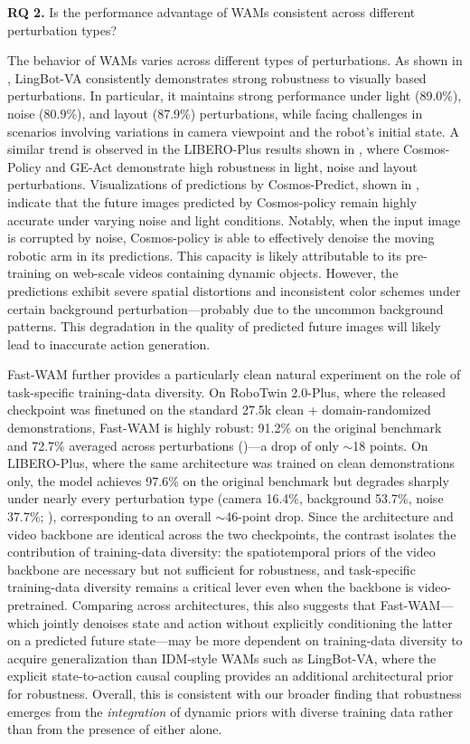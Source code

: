 \documentclass{article}
\begin{document}
\textbf{RQ 2.} Is the performance advantage of WAMs consistent across different perturbation types?

The behavior of WAMs varies across different types of perturbations. As shown in , LingBot-VA consistently demonstrates strong robustness to visually based perturbations. In particular, it maintains strong performance under light (89.0\%), noise (80.9\%), and layout (87.9\%) perturbations, while facing challenges in scenarios involving variations in camera viewpoint and the robot's initial state. A similar trend is observed in the LIBERO-Plus results shown in , where Cosmos-Policy and GE-Act demonstrate high robustness in light, noise and layout perturbations. Visualizations of predictions by Cosmos-Predict,  shown in , indicate that the future images predicted by Cosmos-policy remain highly accurate under varying noise and light conditions. Notably, when the input image is corrupted by noise, Cosmos-policy is able to effectively denoise the moving robotic arm in its predictions. This capacity is likely attributable to its pre-training on web-scale videos containing dynamic objects. However, the predictions exhibit severe spatial distortions and inconsistent color schemes under certain background perturbation---probably due to the uncommon background patterns. This degradation in the quality of predicted future images will likely lead to inaccurate action generation.

Fast-WAM further provides a particularly clean natural experiment on the role of task-specific training-data diversity. On RoboTwin 2.0-Plus, where the released checkpoint was finetuned on the standard 27.5k clean + domain-randomized demonstrations, Fast-WAM is highly robust: 91.2\% on the original benchmark and 72.7\% averaged across perturbations ()---a drop of only $\sim$18 points. On LIBERO-Plus, where the same architecture was trained on clean demonstrations only, the model achieves 97.6\% on the original benchmark but degrades sharply under nearly every perturbation type (camera 16.4\%, background 53.7\%, noise 37.7\%; ), corresponding to an overall $\sim$46-point drop. Since the architecture and video backbone are identical across the two checkpoints, the contrast isolates the contribution of training-data diversity: the spatiotemporal priors of the video backbone are necessary but not sufficient for robustness, and task-specific training-data diversity remains a critical lever even when the backbone is video-pretrained. Comparing across architectures, this also suggests that Fast-WAM---which jointly denoises state and action without explicitly conditioning the latter on a predicted future state---may be more dependent on training-data diversity to acquire generalization than IDM-style WAMs such as LingBot-VA, where the explicit state-to-action causal coupling provides an additional architectural prior for robustness. Overall, this is consistent with our broader finding that robustness emerges from the \emph{integration} of dynamic priors with diverse training data rather than from the presence of either alone.
\end{document}
